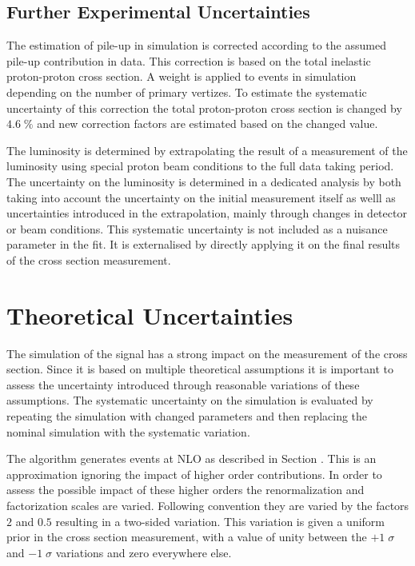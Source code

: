 \subsection{Further Experimental Uncertainties}

The estimation of pile-up in simulation is corrected according to the assumed pile-up contribution in data. This correction is based on the total inelastic proton-proton cross section.
A weight is applied to events in simulation depending on the number of primary vertizes. To estimate the systematic uncertainty of this correction the total proton-proton cross section is changed
by $4.6 \; \%$ and new correction factors are estimated based on the changed value.

The luminosity is determined by extrapolating the result of a measurement  of the luminosity using special proton beam conditions to the full data taking period.
The uncertainty on the luminosity is determined in a dedicated analysis by both taking into account the uncertainty on the initial measurement itself as welll as uncertainties
introduced in the extrapolation, mainly through changes in detector or beam conditions.
This systematic uncertainty is not included as a nuisance parameter in the fit. It is externalised by directly applying it on the final results of the cross section measurement.

\section{Theoretical Uncertainties}
\label{sec:theo_uncert}

The simulation of the \ttbar signal has a strong impact on the measurement of the \ttbar cross section.
Since it is based on multiple theoretical assumptions it is important to assess the uncertainty introduced through reasonable variations of these assumptions.
The systematic uncertainty on the simulation is evaluated by repeating the simulation with changed parameters and then replacing the nominal simulation with the systematic variation.

The \POWHEG algorithm generates \ttbar events at NLO as described in Section .
This is an approximation ignoring the impact of higher order contributions. In order to assess the possible impact of these higher orders the renormalization and factorization scales are
varied. Following convention  they are varied by the factors $2$ and $0.5$ resulting in a two-sided variation.
This variation is given a uniform prior in the cross section measurement, with a value of unity between the $+1 \; \sigma$ and $-1 \; \sigma$ variations and zero everywhere else.

